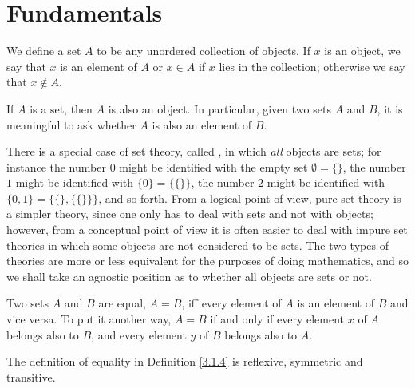 \section{Fundamentals}

\begin{definition}\label{3.1.1}
We define a set \(A\) to be any unordered collection of objects.
If \(x\) is an object, we say that \(x\) is an element of \(A\) or \(x \in A\) if \(x\) lies in the collection;
otherwise we say that \(x \notin A\).
\end{definition}

\begin{axiom}\label{3.1}
If \(A\) is a set, then \(A\) is also an object.
In particular, given two sets \(A\) and \(B\), it is meaningful to ask whether \(A\) is also an element of \(B\).
\end{axiom}

\setcounter{theorem}{2}
\begin{remark}\label{3.1.3}
There is a special case of set theory, called , in which \emph{all} objects are sets;
for instance the number \(0\) might be identified with the empty set \(\emptyset = \{\}\), the number \(1\) might be identified with \(\{0\} = \{\{\}\}\), the number \(2\) might be identified with \(\{0, 1\} = \{\{\}, \{\{\}\}\}\), and so forth.
From a logical point of view, pure set theory is a simpler theory, since one only has to deal with sets and not with objects;
however, from a conceptual point of view it is often easier to deal with impure set theories in which some objects are not considered to be sets.
The two types of theories are more or less equivalent for the purposes of doing mathematics, and so we shall take an agnostic position as to whether all objects are sets or not.
\end{remark}

\begin{definition}\label{3.1.4}
Two sets \(A\) and \(B\) are equal, \(A = B\), iff every element of \(A\) is an element of \(B\) and vice versa.
To put it another way, \(A = B\) if and only if every element \(x\) of \(A\) belongs also to \(B\), and every element \(y\) of \(B\) belongs also to \(A\).
\end{definition}

\begin{additional corollary}\label{ac 3.1.1}
The definition of equality in Definition \ref{3.1.4} is reflexive, symmetric and transitive.
\end{additional corollary}


